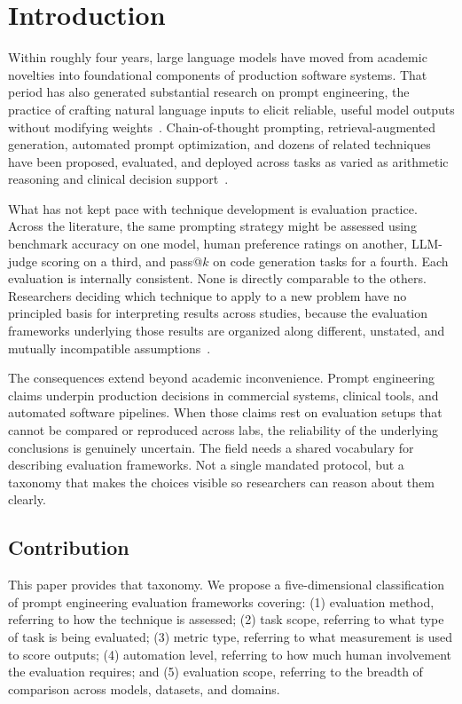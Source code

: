 \documentclass[journal]{IEEEtran}
\begin{document}
\section{Introduction}
\label{sec:introduction}
Within roughly four years, large language models have moved from
academic novelties into foundational components of production software
systems. That period has also generated substantial research on prompt
engineering, the practice of crafting natural language inputs to elicit
reliable, useful model outputs without modifying weights~\cite{liu2021pretrain, schulhoff2024prompt}. Chain-of-thought
prompting, retrieval-augmented generation, automated prompt
optimization, and dozens of related techniques have been proposed,
evaluated, and deployed across tasks as varied as arithmetic reasoning
and clinical decision support~\cite{wei2022chain, lewis2020retrieval, sahoo2024systematic}.

What has not kept pace with technique development is evaluation practice.
Across the literature, the same prompting strategy might be assessed using
benchmark accuracy on one model, human preference ratings on another,
LLM-judge scoring on a third, and pass@$k$ on code generation tasks for
a fourth. Each evaluation is internally consistent. None is directly comparable to the
others. Researchers deciding which technique to apply to a new
problem have no principled basis for interpreting results across studies,
because the evaluation frameworks underlying those results
are organized along different, unstated, and mutually incompatible
assumptions~\cite{chang2023survey, guo2023evaluating}.

The consequences extend beyond academic inconvenience. Prompt engineering claims
underpin production decisions in commercial systems, clinical tools,
and automated software pipelines. When those claims rest on
evaluation setups that cannot be compared or reproduced across
labs, the reliability of the underlying conclusions is genuinely
uncertain. The field needs a shared vocabulary for describing
evaluation frameworks. Not a single mandated protocol, but a taxonomy that makes the choices visible so researchers can reason about them clearly.

\subsection*{Contribution}

This paper provides that taxonomy. We propose a five-dimensional
classification of prompt engineering evaluation frameworks covering:
(1) evaluation method, referring to how the technique is assessed;
(2) task scope, referring to what type of task is being evaluated;
(3) metric type, referring to what measurement is used to score outputs;
(4) automation level, referring to how much human involvement the evaluation
requires; and (5) evaluation scope, referring to the breadth of comparison
across models, datasets, and domains.
\end{document}
